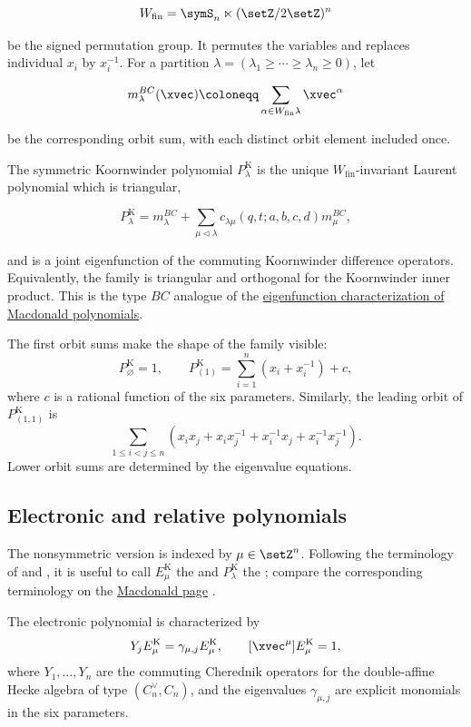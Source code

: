 \[
  W_{\mathrm{fin}}=\symS_n\ltimes(\setZ/2\setZ)^n
\]

be the signed permutation group.  It permutes the variables and replaces
individual \(x_i\) by \(x_i^{-1}\).  For a partition
\(\lambda=(\lambda_1\geq\dotsb\geq\lambda_n\geq0)\), let

\[
  m_\lambda^{BC}(\xvec)
  \coloneqq
  \sum_{\alpha\in W_{\mathrm{fin}}\lambda}\xvec^\alpha
\]

be the corresponding orbit sum, with each distinct orbit element included
once.

The symmetric Koornwinder polynomial \(P_\lambda^{\mathrm K}\) is the unique
\(W_{\mathrm{fin}}\)-invariant Laurent polynomial which is triangular,

\[
  P_\lambda^{\mathrm K}
  =
  m_\lambda^{BC}
  +\sum_{\mu\lhd\lambda}c_{\lambda\mu}(q,t;a,b,c,d)m_\mu^{BC},
\]

and is a joint eigenfunction of the commuting Koornwinder difference
operators.  Equivalently, the family is triangular and orthogonal for the
Koornwinder inner product.  This is the type \(BC\) analogue of the
\hyperref[macdonaldPEigenvectors]{eigenfunction characterization of Macdonald
polynomials}.

\begin{example}
The first orbit sums make the shape of the family visible:
\[
  P_{\varnothing}^{\mathrm K}=1,
  \qquad
  P_{(1)}^{\mathrm K}
  =\sum_{i=1}^n(x_i+x_i^{-1})+c,
\]
where \(c\) is a rational function of the six parameters.  Similarly, the
leading orbit of \(P_{(1,1)}^{\mathrm K}\) is
\[
  \sum_{1\leq i<j\leq n}
  (x_ix_j+x_ix_j^{-1}+x_i^{-1}x_j+x_i^{-1}x_j^{-1}).
\]
Lower orbit sums are determined by the eigenvalue equations.
\end{example}


\subsection[koornwinderNonsymmetric]{Electronic and relative polynomials}

The nonsymmetric version is indexed by \(\mu\in\setZ^n\).  Following the
terminology of  and , it is useful to
call \(E_\mu^{\mathrm K}\) the  and
\(P_\lambda^{\mathrm K}\) the ; compare
the corresponding terminology on the
\hyperref[macdonaldP]{Macdonald page} \cite{ColmenarejoRam2022x}.

The electronic polynomial is characterized by
\[
  Y_jE_\mu^{\mathrm K}=\gamma_{\mu,j}E_\mu^{\mathrm K},
  \qquad
  [\xvec^\mu]E_\mu^{\mathrm K}=1,
\]
where \(Y_1,\dotsc,Y_n\) are the commuting Cherednik operators for the
double-affine Hecke algebra of type \((C_n^\vee,C_n)\), and the eigenvalues
\(\gamma_{\mu,j}\) are explicit monomials in the six parameters.


